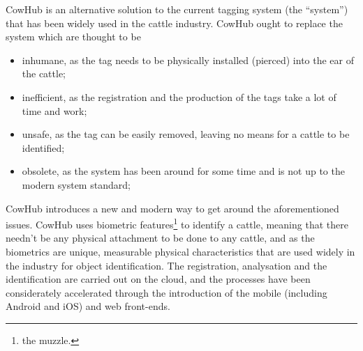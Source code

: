 CowHub is an alternative solution to the current tagging system (the ``system'') that has been widely used in the cattle industry. CowHub ought to replace the system which are thought to be 
\begin{itemize}
	\item inhumane, as the tag needs to be physically installed (pierced) into the ear of the cattle;
	\item inefficient, as the registration and the production of the tags take a lot of time and work;
	\item unsafe, as the tag can be easily removed, leaving no means for a cattle to be identified;
	\item obsolete, as the system has been around for some time and is not up to the modern system standard; 
\end{itemize}

CowHub introduces a new and modern way to get around the aforementioned issues. CowHub uses biometric features\footnote{the muzzle.} to identify a cattle, meaning that there needn't be any physical attachment to be done to any cattle, and as the biometrics are unique, measurable physical characteristics that are used widely in the industry for object identification\cite{biometrics}. The registration, analysation and the identification are carried out on the cloud, and the processes have been considerately accelerated through the introduction of the mobile (including Android and iOS) and web front-ends.


